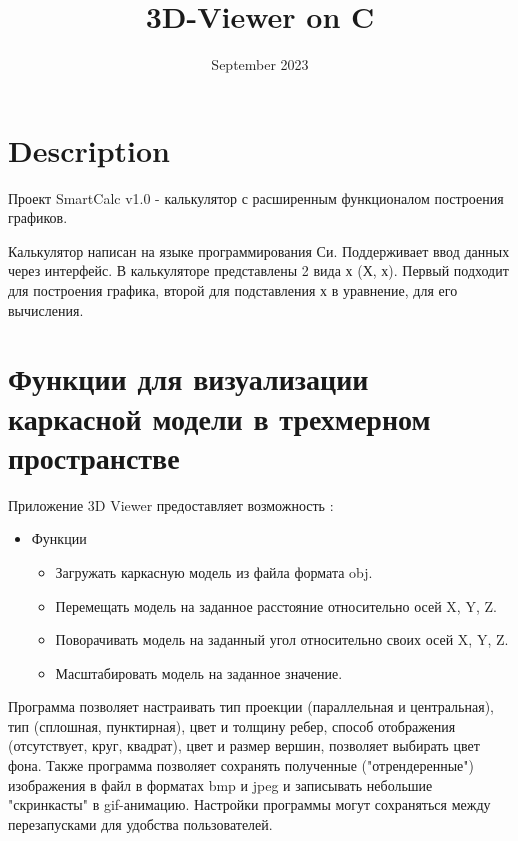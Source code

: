 \documentclass[12pt, a4paper]{article}
\title{3D-Viewer on C}
\date{September 2023}
\begin{document}
\maketitle

\pagebreak

\tableofcontents

\pagebreak

\section{Description}

Проект SmartCalc v1.0 - калькулятор с расширенным функционалом построения графиков.

Калькулятор написан на языке программирования Си. Поддерживает ввод данных через интерфейс. В калькуляторе представлены 2 вида х (Х, х). Первый подходит для построения графика, второй для подставления х в уравнение, для его вычисления.

\pagebreak

\section{Функции для визуализации каркасной модели в трехмерном пространстве}

Приложение 3D Viewer предоставляет возможность :
  \begin{itemize}
    \item Функции
    \begin{itemize}
      \item  Загружать каркасную модель из файла формата obj.
      \item Перемещать модель на заданное расстояние относительно осей X, Y, Z.
      \item Поворачивать модель на заданный угол относительно своих осей X, Y, Z.
      \item Масштабировать модель на заданное значение.
    \end{itemize}
  \end{itemize}

  Программа позволяет настраивать тип проекции (параллельная и центральная), тип (сплошная, пунктирная), цвет и толщину ребер, способ отображения (отсутствует, круг, квадрат), цвет и размер вершин, позволяет выбирать цвет фона.
Также программа позволяет сохранять полученные ("отрендеренные") изображения в файл в форматах bmp и jpeg и записывать небольшие "скринкасты" в gif-анимацию. Настройки программы могут сохраняться между перезапусками для удобства пользователей.

\pagebreak
\end{document}

